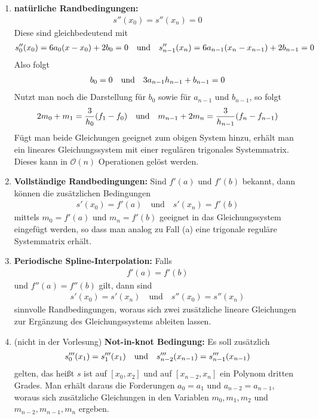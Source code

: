 \begin{enumerate}[label=(\alph*)]
	\item \textbf{natürliche Randbedingungen:} 
	\begin{align}
		\label{1.12}
		s''(x_0) = s''(x_n)=0
	\end{align}
	Diese sind gleichbedeutend mit 
	\begin{align}
		s''_0(x_0)=6a_0(x-x_0)+2b_0=0\quad\text{und}\quad s''_{n-1}(x_n)=6a_{n-1}(x_n-x_{n-1})+2b_{n-1}=0\notag
	\end{align}
	Also folgt
	\begin{align}
		b_0=0\quad\text{und}\quad 3a_{n-1}h_{n-1} + b_{n-1}=0\notag
	\end{align}
	Nutzt man noch die Darstellung für $b_0$ sowie für $a_{n-1}$ und $b_{n-1}$, so folgt
	\begin{align}
		2m_0+m_1 = \frac{3}{h_0}(f_1-f_0) \quad\text{und}\quad m_{n-1}+2m_n=\frac{3}{h_{n-1}}(f_n-f_{n-1})\notag
	\end{align}
	Fügt man beide Gleichungen geeignet zum obigen System hinzu, erhält man ein lineares Gleichungssystem mit einer regulären trigonales Systemmatrix. Dieses kann in $\mathcal{O}(n)$ Operationen gelöst werden.
	\item \textbf{Vollständige Randbedingungen:} Sind $f'(a)$ und $f'(b)$ bekannt, dann können die zusätzlichen Bedingungen
	\begin{align}
		\label{1.13}
		s'(x_0)=f'(a)\quad\text{und}\quad s'(x_n)=f'(b)
	\end{align}
	mittels $m_0=f'(a)$ und $m_n=f'(b)$ geeignet in das Gleichungssystem eingefügt werden, so dass man analog zu Fall (a) eine trigonale reguläre Systemmatrix erhält.
	\item \textbf{Periodische Spline-Interpolation:} Falls
	\begin{align}
		\label{1.14}
		f'(a)=f'(b)
	\end{align}
	und $f''(a)=f''(b)$ gilt, dann sind 
	\begin{align}
	\label{1.15}
		s'(x_0)=s'(x_n)\quad\text{und}\quad s''(x_0)=s''(x_n)
	\end{align}
	sinnvolle Randbedingungen, woraus sich zwei zusätzliche lineare Gleichungen zur Ergänzung des Gleichungssystems ableiten lassen.
	\item (nicht in der Vorlesung) \textbf{Not-in-knot Bedingung:} Es soll zusätzlich
	\begin{align}
		s'''_0(x_1)=s'''_1(x_1) \quad\text{und}\quad s'''_{n-2}(x_{n-1})=s'''_{n-1}(x_{n-1})\notag
	\end{align}
	gelten, das heißt $s$ ist auf $[x_0,x_2]$ und auf $[x_{n-2},x_n]$ ein Polynom dritten Grades. Man erhält daraus die Forderungen $a_0=a_1$ und $a_{n-2}=a_{n-1}$, woraus sich zusätzliche Gleichungen in den Variablen $m_0,m_1,m_2$ und $m_{n-2},m_{n-1},m_n$ ergeben.
\end{enumerate}

